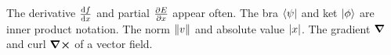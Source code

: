 \documentclass{article}
\begin{document}
The derivative $\dv{f}{x}$ and partial $\pdv{E}{x}$ appear often.
The bra $\bra{\psi}$ and ket $\ket{\phi}$ are inner product notation.
The norm $\norm{v}$ and absolute value $\abs{x}$.
The gradient $\grad$ and curl $\curl$ of a vector field.
\end{document}
